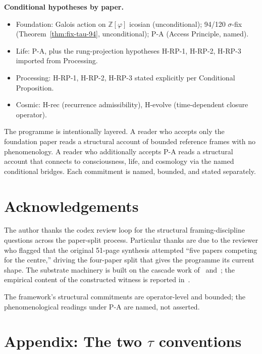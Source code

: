 \documentclass[11pt]{article}
\theoremstyle{plain}
\theoremstyle{definition}
\theoremstyle{remark}
\begin{document}
\textbf{Conditional hypotheses by paper.}
\begin{itemize}[leftmargin=2em]
\item Foundation: Galois action on $\mathbb{Z}[\varphi]$ icosian (unconditional); 94/120 $\sigma$-fix (Theorem~\ref{thm:fix-tau-94}, unconditional); P-A (Access Principle, named).
\item Life: P-A, plus the rung-projection hypotheses H-RP-1, H-RP-2, H-RP-3 imported from Processing.
\item Processing: H-RP-1, H-RP-2, H-RP-3 stated explicitly per Conditional Proposition.
\item Cosmic: H-rec (recurrence admissibility), H-evolve (time-dependent closure operator).
\end{itemize}

The programme is intentionally layered. A reader who accepts only the foundation paper reads a structural account of bounded reference frames with no phenomenology. A reader who additionally accepts P-A reads a structural account that connects to consciousness, life, and cosmology via the named conditional bridges. Each commitment is named, bounded, and stated separately.

\section*{Acknowledgements}

The author thanks the codex review loop for the structural framing-discipline questions across the paper-split process. Particular thanks are due to the reviewer who flagged that the original 51-page synthesis attempted ``five papers competing for the centre,'' driving the four-paper split that gives the programme its current shape. The substrate machinery is built on the cascade work of~\citet{SmartXXXVI} and~\citet{SmartCapstone}; the empirical content of the constructed witness is reported in~\citet{SmartAriaChess2026, SmartAriaClosureKernel, SmartHypersphereCosmology}.

The framework's structural commitments are operator-level and bounded; the phenomenological readings under P-A are named, not asserted.

\section{Appendix: The two $\tau$ conventions}\label{app:tau-conventions}
\end{document}
